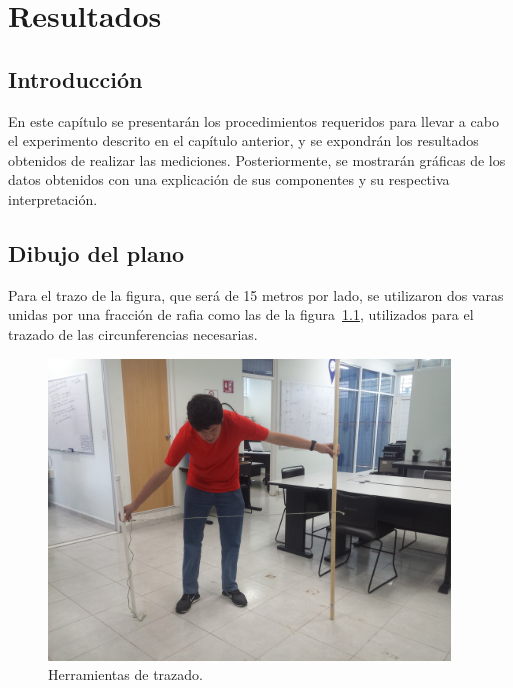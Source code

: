 
\chapter{Resultados} %

\label{Chap:Res} %

\section{Introducción}

En este capítulo se presentarán los procedimientos requeridos para llevar a cabo el experimento descrito en el capítulo anterior, y se expondrán los resultados obtenidos de realizar las mediciones. Posteriormente, se mostrarán gráficas de los datos obtenidos con una explicación de sus componentes y su respectiva interpretación. \\

\section{Dibujo del plano}

Para el trazo de la figura, que será de 15 metros por lado, se utilizaron dos varas unidas por una fracción de rafia como las de la figura~\ref{fig:HerTraz}, utilizados para el trazado de las circunferencias necesarias.\\

\begin{figure}[H]
\centering
\includegraphics[width=0.95\textwidth]{Figures/Herr}
\caption[Herramientas de trazado.]{Herramientas de trazado.}
\label{fig:HerTraz}
\end{figure}

